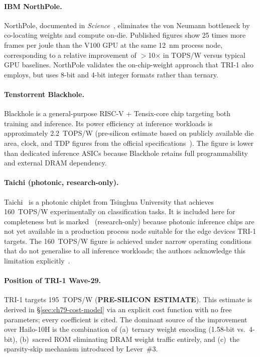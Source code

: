 \paragraph{IBM NorthPole.}
NorthPole, documented in \textit{Science}~\cite{modha2023northpole},
eliminates the von Neumann bottleneck by co-locating weights and compute
on-die.
Published figures show 25 times more frames per joule than the V100 GPU
at the same 12~nm process node, corresponding to a relative improvement
of $>$10$\times$ in TOPS/W versus typical GPU baselines.
NorthPole validates the on-chip-weight approach that TRI-1 also employs,
but uses 8-bit and 4-bit integer formats rather than ternary.

\paragraph{Tenstorrent Blackhole.}
Blackhole is a general-purpose RISC-V + Tensix-core chip targeting
both training and inference.
Its power efficiency at inference workloads is approximately 2.2~TOPS/W
(pre-silicon estimate based on publicly available die area, clock, and
TDP figures from the official specifications~\cite{tenstorrent_blackhole_specs}).
The figure is lower than dedicated inference ASICs because Blackhole
retains full programmability and external DRAM dependency.

\paragraph{Taichi (photonic, research-only).}
Taichi~\cite{xu2024taichi} is a photonic chiplet from Tsinghua University
that achieves 160~TOPS/W experimentally on classification tasks.
It is included here for completeness but is marked \dag\ (research-only)
because photonic inference chips are not yet available in a production
process node suitable for the edge devices TRI-1 targets.
The 160~TOPS/W figure is achieved under narrow operating conditions that
do not generalise to all inference workloads; the authors acknowledge
this limitation explicitly~\cite{xu2024taichi}.

\paragraph{Position of TRI-1 Wave-29.}
TRI-1 targets 195~TOPS/W (\textbf{PRE-SILICON ESTIMATE}).
This estimate is derived in §\ref{sec:ch79-cost-model} via an explicit
cost function with no free parameters; every coefficient is cited.
The dominant source of the improvement over Hailo-10H is the
combination of (a)~ternary weight encoding (1.58-bit vs.\ 4-bit),
(b)~sacred ROM eliminating DRAM weight traffic entirely, and
(c)~the sparsity-skip mechanism introduced by Lever~\#3.

